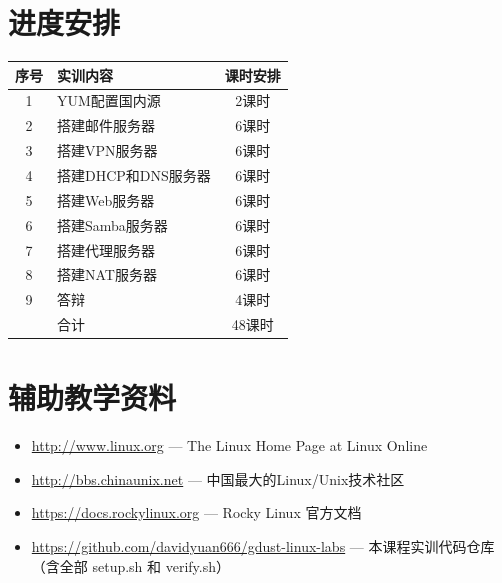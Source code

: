 \documentclass[12pt,a4paper]{ctexart}
\begin{document}
\section{进度安排}

\begin{table}[h]
\centering
\begin{tabular}{clc}
\toprule
序号 & 实训内容              & 课时安排 \\
\midrule
1  & YUM配置国内源          & 2课时  \\
2  & 搭建邮件服务器          & 6课时  \\
3  & 搭建VPN服务器           & 6课时  \\
4  & 搭建DHCP和DNS服务器     & 6课时  \\
5  & 搭建Web服务器           & 6课时  \\
6  & 搭建Samba服务器         & 6课时  \\
7  & 搭建代理服务器          & 6课时  \\
8  & 搭建NAT服务器           & 6课时  \\
9  & 答辩                    & 4课时  \\
\midrule
   & 合计                    & 48课时 \\
\bottomrule
\end{tabular}
\end{table}

\section{辅助教学资料}

\begin{itemize}
  \item \url{http://www.linux.org} — The Linux Home Page at Linux Online
  \item \url{http://bbs.chinaunix.net} — 中国最大的Linux/Unix技术社区
  \item \url{https://docs.rockylinux.org} — Rocky Linux 官方文档
  \item \url{https://github.com/davidyuan666/gdust-linux-labs} — 本课程实训代码仓库（含全部 setup.sh 和 verify.sh）
\end{itemize}
\end{document}
